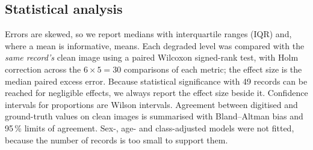 \subsection{Statistical analysis}\label{sec:stats}
Errors are skewed, so we report medians with interquartile ranges (IQR) and, where a mean is informative, means. Each degraded level was compared with the \emph{same record's} clean image using a paired Wilcoxon signed-rank test, with Holm correction across the $6\times5=30$ comparisons of each metric; the effect size is the median paired excess error. Because statistical significance with 49 records can be reached for negligible effects, we always report the effect size beside it. Confidence intervals for proportions are Wilson intervals. Agreement between digitised and ground-truth values on clean images is summarised with Bland--Altman bias and 95\,\% limits of agreement. Sex-, age- and class-adjusted models were not fitted, because the number of records is too small to support them.
